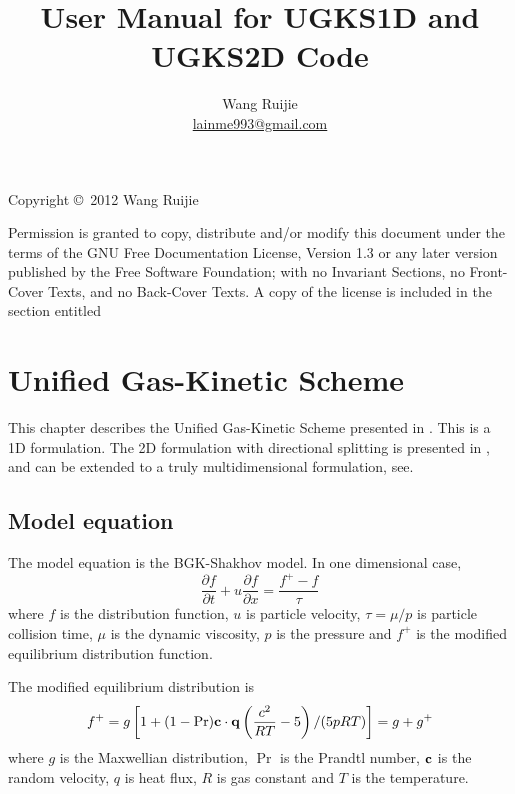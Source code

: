 \documentclass[a4paper]{book}
\begin{document}
\title{User Manual for UGKS1D and UGKS2D Code}
\author{Wang Ruijie\\\href{mailto:lainme993@gmail.com}{lainme993@gmail.com}}
\maketitle

\thispagestyle{empty}
Copyright \copyright\ 2012 Wang Ruijie

Permission is granted to copy, distribute and/or modify this document
under the terms of the GNU Free Documentation License, Version 1.3 or
any later version published by the Free Software Foundation; with no
Invariant Sections, no Front-Cover Texts, and no Back-Cover Texts.  A
copy of the license is included in the section entitled 

\frontmatter
\tableofcontents

\mainmatter

\chapter{Unified Gas-Kinetic Scheme}
This chapter describes the Unified Gas-Kinetic Scheme presented in \cite{Xu2010,Xu2011}. This is a 1D formulation. The 2D formulation with directional splitting is presented in \cite{Huang2012}, and can be extended to a truly multidimensional formulation, see\cite{Xu2005}.

\section{Model equation}
The model equation is the BGK-Shakhov model. In one dimensional case,
\begin{equation}
    \label{eq:bgk-shakhov}
    \frac{\partial f}{\partial t}+u\frac{\partial f}{\partial x}=\frac{f^+-f}{\tau}
\end{equation}
where $f$ is the distribution function, $u$ is particle velocity, $\tau=\mu/p$ is particle collision time, $\mu$ is the dynamic viscosity, $p$ is the pressure and $f^+$ is the modified equilibrium distribution function.

The modified equilibrium distribution is
\begin{equation}
    f^+ = g\left[1+(1-\Pr){\bf c}\cdot{\bf q}\left(\frac{c^2}{RT}-5\right)/(5pRT)\right]=g+g^+
\end{equation}
where $g$ is the Maxwellian distribution, $\Pr$ is the Prandtl number, ${\bf c}$ is the random velocity, $q$ is heat flux, $R$ is gas constant and $T$ is the temperature.
\end{document}
